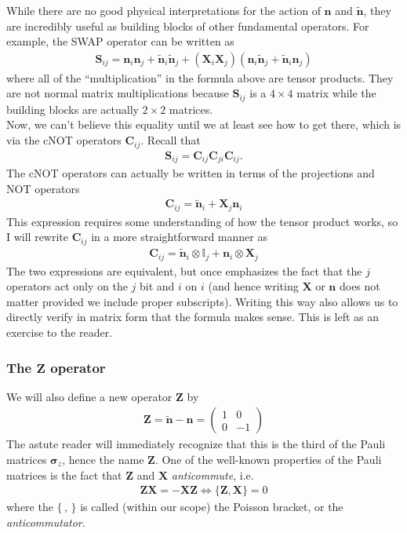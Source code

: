 \documentclass{book}
\theoremstyle{definition}
\newcommand{\n}{\mathbf{n}}
\newcommand{\X}{\mathbf{X}}
\newcommand{\s}{\mathbf{S}}
\newcommand{\Z}{\mathbf{Z}}
\begin{document}
While there are no good physical interpretations for the action of $\mathbf{n}$ and $\tilde{\mathbf{n}}$, they are incredibly useful as building blocks of other fundamental operators. For example, the SWAP operator can be written as
\begin{align}\label{S}
\boxed{\s_{ij} = \n_i \n_j + \tilde{\n}_i\tilde{\n}_j + (\X_i \X_j)(\n_i \tilde{\n}_j + \tilde{\n}_i\n_j)}
\end{align}
where all of the ``multiplication'' in the formula above are tensor products. They are not normal matrix multiplications because $\s_{ij}$ is a $4\times 4$ matrix while the building blocks are actually $2\times 2$ matrices. \\

Now, we can't believe this equality until we at least see how to get there, which is via the cNOT operators $\mathbf{C}_{ij}$. Recall that 
\begin{align}
\s_{ij} = \mathbf{C}_{ij}\mathbf{C}_{ji}\mathbf{C}_{ij}.
\end{align}
The cNOT operators can actually be written in terms of the projections and NOT operators
\begin{align}
\boxed{\mathbf{C}_{ij} = \tilde{\n}_i + \X_j \n_i}
\end{align}
This expression requires some understanding of how the tensor product works, so I will rewrite $\mathbf{C}_{ij}$ in a more straightforward manner as
\begin{align}
\boxed{\mathbf{C}_{ij} = \tilde{\n}_i\otimes \mathbb{I}_j + \n_i \otimes \X_j }
\end{align}
The two expressions are equivalent, but once emphasizes the fact that the $j$ operators act only on the $j$ bit and $i$ on $i$ (and hence writing $\X$ or $\n$ does not matter provided we include proper subscripts). Writing this way also allows us to directly verify in matrix form that the formula makes sense. This is left as an exercise to the reader.

\subsubsection{The $\Z$ operator}

We will also define a new operator $\Z$ by
\begin{align}
\boxed{\Z = \tilde{\n} - \n = \begin{pmatrix}
	1 & 0 \\ 0 & -1
	\end{pmatrix}}
\end{align}
The astute reader will immediately recognize that this is the third of the Pauli matrices $\bm{\sigma}_z$, hence the name $\Z$. One of the well-known properties of the Pauli matrices is the fact that $\Z$ and $\X$ \textit{anticommute}, i.e.
\begin{align}
\Z \X = - \X\Z \iff \{ \Z, \X \} = 0
\end{align}
where the $\{\,,\,\}$ is called (within our scope) the Poisson bracket, or the \textit{anticommutator}. \\
\end{document}
